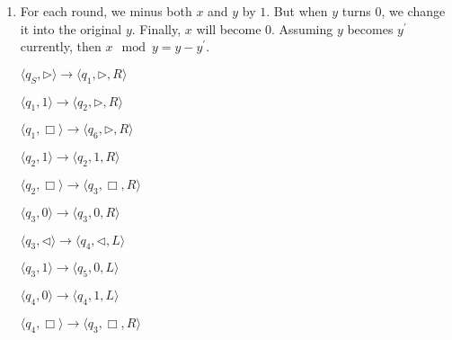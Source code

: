 \documentclass[12pt,a4paper]{article}
\makeatletter
\newtheorem*{solution}{Solution}
\theoremstyle{definition}
\renewenvironment{solution}[1][Solution] {\par\pushQED{\qed}\normalfont\topsep6\p@\@plus6\p@\relax\trivlist\item[\hskip\labelsep\bfseries#1\@addpunct{.}]\ignorespaces}{\popQED\endtrivlist\@endpefalse} \makeatother
\makeatother
\begin{document}
\begin{enumerate}
\begin{center}
\begin{tabular}{ll|c|c|c|c|c|c|c|c|c|c|c|c|c|c}
	\cline{2-16}
	\multicolumn{2}{c}{} & \multicolumn{1}{c}{$\uparrow$} & \multicolumn{11}{c}{}\\[-4px]
	\multicolumn{2}{c}{} & \multicolumn{1}{c}{$?$} & \multicolumn{11}{c}{}\\[4pt]

\end{tabular}
\end{center}

\begin{solution}
	For each round, we minus both $x$ and $y$ by $1$. But when $y$ turns $0$, we change it into the original $y$. Finally, $x$ will become $0$. Assuming $y$ becomes $y^\prime$ currently, then $x\mod y=y-y^\prime$.
	
	\hspace{2mm}
	\begin{minipage}{0.5\textwidth}
		\begin{center}
			
			$\langle q_S,\triangleright\rangle\rightarrow\langle q_1,\triangleright,R\rangle$
			
			
			$\langle q_1,1\rangle\rightarrow\langle q_2,\triangleright,R\rangle$
			
			$\langle q_1,\Box\rangle\rightarrow\langle q_6,\triangleright,R\rangle$
			
			
			$\langle q_2,1\rangle\rightarrow\langle q_2,1,R\rangle$
			
			$\langle q_2,\Box\rangle\rightarrow\langle q_3,\Box,R\rangle$
			
			
			$\langle q_3,0\rangle\rightarrow\langle q_3,0,R\rangle$
			
			$\langle q_3,\triangleleft\rangle\rightarrow\langle q_4,\triangleleft,L\rangle$
			
			$\langle q_3,1\rangle\rightarrow\langle q_5,0,L\rangle$
		\end{center}
	\end{minipage}
	\begin{minipage}{0.5\textwidth}
		\begin{center}
			
			$\langle q_4,0\rangle\rightarrow\langle q_4,1,L\rangle$
			
			$\langle q_4,\Box\rangle\rightarrow\langle q_3,\Box,R\rangle$
			

\end{center}
\end{minipage}
\end{solution}
\end{enumerate}
\end{document}
